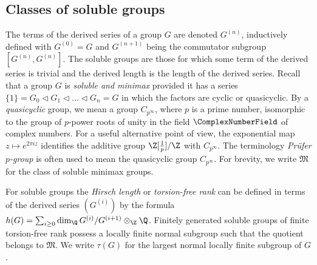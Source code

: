 \subsection{Classes of soluble groups} The terms of the derived series of a group $G$ are denoted $G^{(n)}$, inductively defined with $G^{(0)}=G$ and $G^{(n+1)}$ being the commutator subgroup $[G^{(n)},G^{(n)}]$. The soluble groups are those for which some term of the derived series is trivial and the derived length is the length of the derived series. Recall that a group $G$ is \emph{soluble and minimax} provided it has a series $\{1\}=G_0\triangleleft G_1\triangleleft\dots\triangleleft G_n=G$ in which the factors are cyclic or quasicyclic. By a \emph{quasicyclic} group, we mean a group $C_{p^\infty}$, where $p$ is a prime number, isomorphic to the group of $p$-power roots of unity in the field $\ComplexNumberField$ of complex numbers. For a useful alternative point of view, the exponential map $z\mapsto e^{2\pi iz}$ identifies the additive group $\Z[\frac1p]/\Z$ with $C_{p^\infty}$. The terminology \emph{Prüfer $p$-group} is often used to mean the quasicyclic group $C_{p^\infty}$. For brevity, we write $\mathfrak M$ for the class of soluble minimax groups.

For soluble groups the \emph{Hirsch length} or \emph{torsion-free rank} can be defined in terms of the derived series $(G^{(i)})$ by the formula $h(G)=\sum_{i\ge0}\dim_\Q G^{(i)}/G^{(i+1)}\otimes_\Z\Q$. Finitely generated soluble groups of finite torsion-free rank possess a locally finite normal subgroup such that the quotient belongs to $\mathfrak M$. We write $\tau(G)$ for the largest normal locally finite subgroup of $G$.

